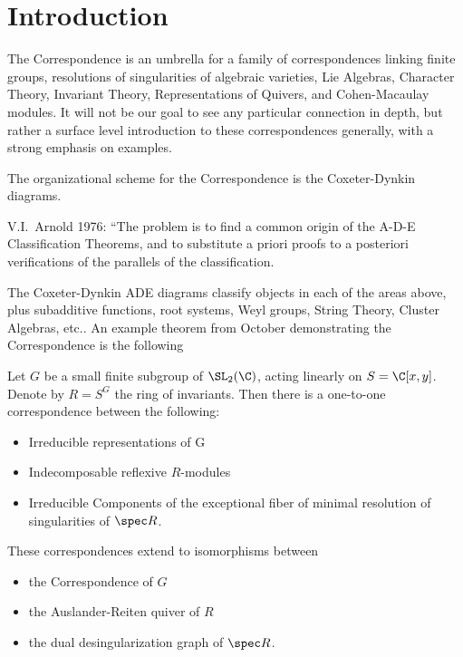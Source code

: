 \newpage
\section{Introduction}


The \mc Correspondence is an umbrella for a family of correspondences linking finite groups, resolutions of singularities of algebraic varieties, Lie Algebras, Character Theory, Invariant Theory, Representations of Quivers, and Cohen-Macaulay modules. It will not be our goal to see any particular connection in depth, but rather a surface level introduction to these correspondences generally, with a strong emphasis on examples. 


The organizational scheme for the \mc Correspondence is the Coxeter-Dynkin diagrams. 

V.I.~Arnold 1976: ``The problem is to find a common origin of the A-D-E Classification Theorems, and to substitute a priori proofs to a posteriori verifications of the parallels of the classification. 
%

The Coxeter-Dynkin ADE diagrams classify objects in each of the areas above, plus subadditive functions, root systems, Weyl groups, String Theory, Cluster Algebras, etc.. An example theorem from October demonstrating the \mc Correspondence is the following


\begin{thm}
Let $G$ be a small finite subgroup of $\SL_2(\C)$, acting linearly on $S= \C[x,y]$. Denote by $R=S^G$ the ring of invariants. Then there is a one-to-one correspondence between the following:
	\begin{itemize}
	\item Irreducible representations of G
	\item Indecomposable reflexive $R$-modules
	\item Irreducible Components of the exceptional fiber of minimal resolution of singularities of $\spec R$.
	\end{itemize}
These correspondences extend to isomorphisms between 
	\begin{itemize}
	\item the \mc Correspondence of $G$
	\item the Auslander-Reiten quiver of $R$
	\item the dual desingularization graph of $\spec R$. 
	\end{itemize}
\end{thm}



